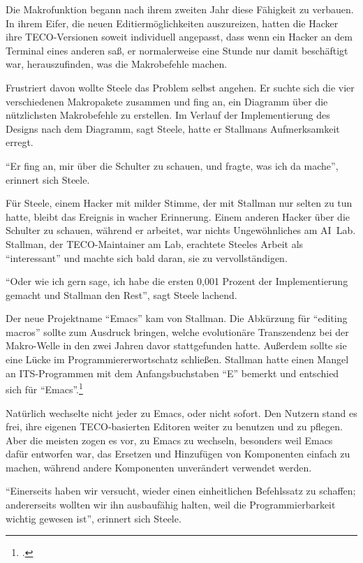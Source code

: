Die Makrofunktion begann nach ihrem zweiten Jahr diese Fähigkeit zu verbauen. In ihrem Eifer, die neuen Editiermöglichkeiten auszureizen, hatten die Hacker ihre TECO-Versionen soweit individuell angepasst, dass wenn ein Hacker an dem Terminal eines anderen saß, er normalerweise eine Stunde nur damit beschäftigt war, herauszufinden, was die Makrobefehle machen.

Frustriert davon wollte Steele das Problem selbst angehen. Er suchte sich die vier verschiedenen Makropakete zusammen und fing an, ein Diagramm über die nützlichsten Makrobefehle zu erstellen. Im Verlauf der Implementierung des Designs nach dem Diagramm, sagt Steele, hatte er Stallmans Aufmerksamkeit erregt.

"`Er fing an, mir über die Schulter zu schauen, und fragte, was ich da mache"', erinnert sich Steele.

Für Steele, einem Hacker mit milder Stimme, der mit Stallman nur selten zu tun hatte, bleibt das Ereignis in wacher Erinnerung. Einem anderen Hacker über die Schulter zu schauen, während er arbeitet, war nichts Ungewöhnliches am AI~Lab. Stallman, der TECO-Maintainer am Lab, erachtete Steeles Arbeit als "`interessant"' und machte sich bald daran, sie zu vervollständigen.

"`Oder wie ich gern sage, ich habe die ersten 0,001 Prozent der Implementierung gemacht und Stallman den Rest"', sagt Steele lachend.

Der neue Projektname "`Emacs"' kam von Stallman. Die Abkürzung für "`editing macros"' sollte zum Ausdruck bringen, welche evolutionäre Transzendenz bei der Makro-Welle in den zwei Jahren davor stattgefunden hatte. Außerdem sollte sie eine Lücke im Programmiererwortschatz schließen. Stallman hatte einen Mangel an ITS-Programmen mit dem Anfangsbuchstaben "`E"' bemerkt und entschied sich für "`Emacs"'.\footcite[][]{rmsetfse}

Natürlich wechselte nicht jeder zu Emacs, oder nicht sofort. Den Nutzern stand es frei, ihre eigenen TECO-basierten Editoren weiter zu benutzen und zu pflegen. Aber die meisten zogen es vor, zu Emacs zu wechseln, besonders weil Emacs dafür entworfen war, das Ersetzen und Hinzufügen von Komponenten einfach zu machen, während andere Komponenten unverändert verwendet werden.

"`Einerseits haben wir versucht, wieder einen einheitlichen Befehlssatz zu schaffen; andererseits wollten wir ihn ausbaufähig halten, weil die Programmierbarkeit wichtig gewesen ist"', erinnert sich Steele.

